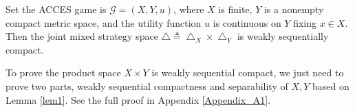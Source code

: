 \begin{proposition} \label{prop1} {}
    Set the ACCES game is $\mathcal{G} = (X, Y,u)$, where $X$ is finite, $Y$ is a nonempty compact metric space, and the utility function $u$ is continuous on $Y$ fixing $x \in X$. Then the joint mixed strategy space $\bigtriangleup \triangleq \bigtriangleup_X \times \bigtriangleup_Y$ is weakly sequentially compact. 
\end{proposition}
\begin{proof-sketch}
    To prove the product space $X \times Y$ is weakly sequential compact, we just need to prove two parts, weakly sequential compactness and separability of $X, Y$ based on Lemma \ref{lem1}. See the full proof in Appendix \ref{Appendix_A1}.
\end{proof-sketch}

